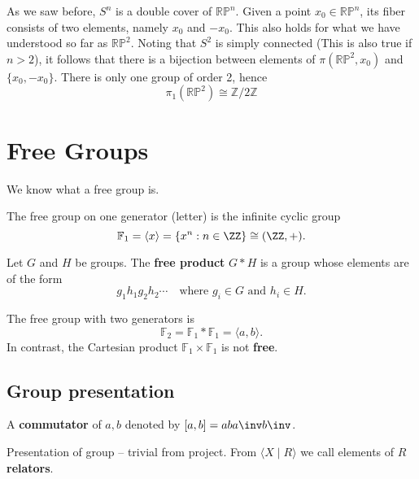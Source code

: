 \documentclass[12pt, a4paper]{article}
\begin{document}
As we saw before, \(S^n\) is a double cover of \(\mathbb{RP}^n\). Given a point \(x_0 \in \mathbb{RP}^n\), its fiber consists of two elements, namely \(x_0\) and \(-x_0\). This also holds for what we have understood so far as \( \mathbb{RP}^2\). Noting that \(S^2\) is simply connected (This is also true if \(n > 2\)), it follows that there is a bijection between elements of \(\pi(\mathbb{RP}^2, x_0)\) and \(\{x_0, -x_0\}\). There is only one group of order 2, hence
\[
\pi_1(\mathbb{RP}^2) \cong \mathbb{Z}/2\mathbb{Z}
\]

\section{Free Groups}

We know what a free group is.

\begin{theorem}
    The free group on one generator (letter) is the infinite cyclic group 
    \[\mathbb{F}_1 = \langle x \rangle = \{x^n : n \in \ZZ\} \cong (\ZZ,+).\]
\end{theorem}

\begin{definition}
    Let \(G\) and \(H\) be groups. The \textbf{free product} \(G * H\) is a group whose elements are of the form 
    \[g_1h_1g_2h_2 \cdots \quad \text{where } g_i \in G \text{ and } h_i \in H.\]
\end{definition}

\begin{example}
    The free group with two generators is 
    \[\mathbb{F}_2 = \mathbb{F}_1 * \mathbb{F}_1 = \langle a,b\rangle.\]
    In contrast, the Cartesian product \(\mathbb{F}_1 \times \mathbb{F}_1\) is not \textbf{free}.
\end{example}

\subsection{Group presentation}

\begin{definition}
    A \textbf{commutator} of \(a,b\) denoted by \([a,b]=aba\inv b\inv\). 
\end{definition}

\begin{definition}
    Presentation of group -- trivial from project. From \(\langle X \mid R \rangle\) we call elements of \(R\) \textbf{relators}.
\end{definition}
\end{document}
